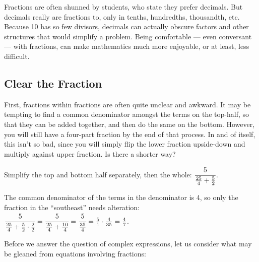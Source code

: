 


Fractions are often shunned by students, who state they prefer decimals.  But decimals really
are fractions to, only in tenths, hundredths, thousandth, etc.  Because 10 has so few divisors,
decimals can actually obscure factors and other structures that would simplify a problem.  
Being comfortable --- even conversant --- with fractions, can make mathematics much more
enjoyable, or at least, less difficult.


\subsection{Clear the Fraction}
First, fractions within fractions are often quite unclear and awkward.  It may be tempting to
find a common denominator amongst the terms on the top-half, so that they can be
added together, and then do the same on the bottom.  However, you will still have a four-part
fraction by the end of that process.  In and of itself, this isn't so bad, since you will simply 
flip the lower fraction upside-down and multiply against upper fraction.  Is there a shorter way?

\begin{example}
	\exProblem
Simplify the top and bottom half separately, then the whole: $\cfrac{5}{\frac{25}{4}+\frac{5}{2}}$.

\exSolution
The common denominator of the terms in the denominator is 4, so only the fraction in the
``southeast'' needs alteration: $\cfrac{5}{\frac{25}{4}+\frac{5}{2}\cdot\frac{2}{2}} = 
\cfrac{5}{\frac{25}{4}+\frac{10}{4}} = \cfrac{5}{\frac{35}{4}} = \frac{5}{1}\cdot\frac{4}{35}
=\frac{4}{7}$.
\end{example}

Before we answer the question of complex expressions, let us consider what may be
gleaned from equations involving fractions:

